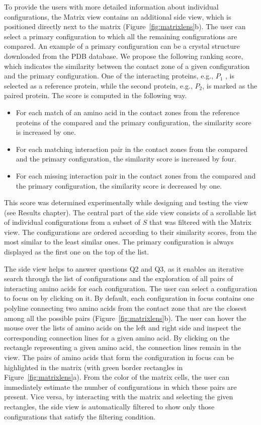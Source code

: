 \documentclass[twocolumn]{bmcart}%
\def\MatView {Matrix view\xspace}
\begin{document}
To provide the users with more detailed information about individual configurations, the \MatView contains an additional side view, which is positioned directly next to the matrix (Figure~\ref{fig:matrixlens}b).
The user can select a primary configuration to which all the remaining configurations are compared.
An example of a primary configuration can be a crystal structure downloaded from the PDB database.
We propose the following ranking score, which indicates the similarity between the contact zone of a given configuration and the primary configuration.
One of the interacting proteins, e.g., $P_1$ , is selected as a reference protein, while the second protein, e.g., $P_2$, is marked as the paired protein.
The score is computed in the following way.
\begin{itemize}
\item For each match of an amino acid in the contact zones from the reference proteins of the compared and the primary configuration, the similarity score is increased by one.
\item For each matching interaction pair in the contact zones from the compared and the primary configuration, the similarity score is increased by four.
\item For each missing interaction pair in the contact zones from the compared and the primary configuration, the similarity score is decreased by one.
\end{itemize}
This score was determined experimentally while designing and testing the view (see Results chapter). 
The central part of the side view consists of a scrollable list of individual configurations from a subset of $S$ that was filtered with the \MatView.
The configurations are ordered according to their similarity scores, from the most similar to the least similar ones.
The primary configuration is always displayed as the first one on the top of the list.

The side view helps to answer questions Q2 and Q3, as it enables an iterative search through the list of configurations and the exploration of all pairs of interacting amino acids for each configuration.
The user can select a configuration to focus on by clicking on it. 
By default, each configuration in focus contains one polyline connecting two amino acids from the contact zone that are the closest among all the possible pairs (Figure~\ref{fig:matrixlens}b).
The user can hover the mouse over the lists of amino acids on the left and right side and inspect the corresponding connection lines for a given amino acid.
By clicking on the rectangle representing a given amino acid, the connection lines remain in the view. 
The pairs of amino acids that form the configuration in focus can be highlighted in the matrix (with green border rectangles in Figure~\ref{fig:matrixlens}a).
From the color of the matrix cells, the user can immediately estimate the number of configurations in which these pairs are present.
Vice versa, by interacting with the matrix and selecting the given rectangles, the side view is automatically filtered to show only those configurations that satisfy the filtering condition.
\end{document}
